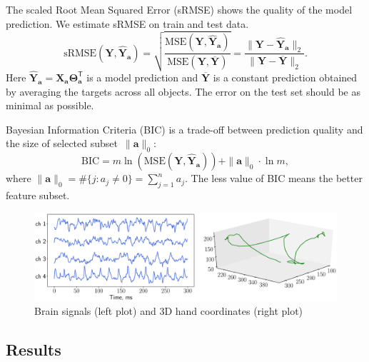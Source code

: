 \documentclass[12pt,twoside]{article}
\theoremstyle{definition}
\newcommand{\ba}{\mathbf{a}}
\newcommand{\bY}{\mathbf{Y}}
\newcommand{\bX}{\mathbf{X}}
\newcommand{\T}{\mathsf{T}}
\newcommand{\bTheta}{\boldsymbol{\Theta}}
\begin{document}
The scaled Root Mean Squared Error (sRMSE) shows the quality of the model prediction. We estimate sRMSE on train and test data.
\begin{equation*}
\text{sRMSE}(\bY, \widehat{\bY}_{\ba}) = \sqrt{\frac{\text{MSE} (\bY, \widehat{\bY}_{\ba})}{\text{MSE} (\bY, \overline{\bY})}} =  \frac{\| \bY - \widehat{\bY}_{\ba} \|_2}{\| \bY - \overline{\bY} \|_2}.
\end{equation*}
Here $\widehat{\bY}_{\ba} = \bX_{\ba} \bTheta_{\ba}^{\T}$ is a model prediction and $\overline{\bY}$ is a constant prediction obtained by averaging the targets across all objects.
The error on the test set should be as minimal as possible.

Bayesian Information Criteria (BIC) is a trade-off between prediction quality and the size of selected subset~$\|\ba\|_0$:
\begin{equation*}
\text{BIC} = m \ln \left( \text{MSE} ( \bY, \widehat{\bY}_{\ba})\right) + \| \ba \|_0 \cdot \ln m,
\end{equation*}
where $\|\ba\|_0 = \#\{j: a_j \neq 0\}= \sum_{j=1}^n a_j$.
The less value of BIC means the better feature subset.

\begin{figure}
	\centering
	\includegraphics[width=\linewidth]{figs/ecog_data}
	\caption{Brain signals (left plot) and 3D hand coordinates (right plot)}
	\label{fig:ecog_data}
\end{figure}

\subsection{Results}
\end{document}
